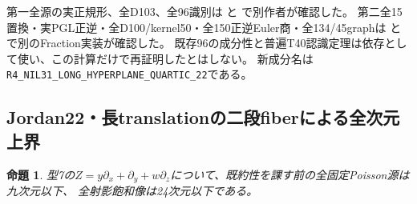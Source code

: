 \documentclass[a4paper,11pt]{ltjsarticle}
\newtheorem{proposition}{命題}[section]
\theoremstyle{definition}
\begin{document}
第一全源の実正規形、全D103、全96識別は
と
で別作者が確認した。
第二全15置換・実PGL正逆・全D100/kernel50・全150正逆Euler商・全134/45graphは
と
で別のFraction実装が確認した。
既存96の成分性と普遍T40認識定理は依存として使い、この計算だけで再証明したとはしない。
新成分名は\texttt{R4\_NIL31\_LONG\_HYPERPLANE\_QUARTIC\_22}である。

\subsection{Jordan22・長translationの二段fiberによる全次元上界}
\begin{proposition}\label{prop:quartic-nil22-long-bound}
型7の$Z=y\partial_x+\partial_y+w\partial_z$について、既約性を課す前の全固定Poisson源は九次元以下、
全射影飽和像は24次元以下である。
\end{proposition}
\end{document}
